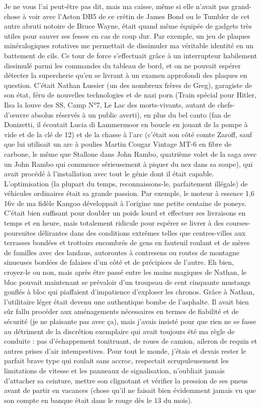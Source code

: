 Je ne vous l’ai peut-être pas dit, mais ma caisse, même si elle n’avait pas grand-chose à voir avec l’Aston DB5 de ce crétin de James Bond ou le Tumbler de cet autre abruti notoire de Bruce Wayne, était quand même équipée de gadgets très utiles pour sauver ses fesses en cas de coup dur. Par exemple, un jeu de plaques minéralogiques rotatives me permettait de dissimuler ma véritable identité en un battement de cils. Ce tour de force s’effectuait grâce à un interrupteur habilement dissimulé parmi les commandes du tableau de bord, et on ne pouvait espérer détecter la supercherie qu’en se livrant à un examen approfondi des plaques en question. C’était Nathan Lussier (un des nombreux frères de Greg), garagiste de son état, féru de nouvelles technologies et de nazi porn (Train spécial pour Hitler, Ilsa la louve des SS, Camp N°7, Le Lac des morts-vivants, autant de chefs-d’œuvre absolus réservés à un public averti), en plus du bel canto (fan de Donizetti, il écoutait Lucia di Lammermoor en boucle en jouant de la pompe à vide et de la clé de 12) et de la chasse à l’arc (c’était son côté comte Zaroff, sauf que lui utilisait un arc à poulies Martin Cougar Vintage MT-6 en fibre de carbone, le même que Stallone dans John Rambo, quatrième volet de la saga avec un John Rambo qui commence sérieusement à piquer du nez dans sa soupe), qui avait procédé à l’installation avec tout le génie dont il était capable. L’optimisation (la plupart du temps, reconnaissons-le, parfaitement illégale) de véhicules ordinaires était sa grande passion. Par exemple, le moteur à essence 1,6 16v de ma fidèle Kangoo développait à l’origine une petite centaine de poneys. C’était bien suffisant pour doubler un poids lourd et effectuer ses livraisons en temps et en heure, mais totalement ridicule pour espérer se livrer à des courses-poursuites délirantes dans des conditions extrêmes telles que centres-villes aux terrasses bondées et trottoirs encombrés de gens en fauteuil roulant et de mères de familles avec des landaus, autoroutes à contresens ou routes de montagne sinueuses bordées de falaises d’un côté et de précipices de l’autre. Eh bien, croyez-le ou non, mais après être passé entre les mains magiques de Nathan, le bloc pouvait maintenant se prévaloir d’un troupeau de cent cinquante mustangs gonflés à bloc qui piaffaient d’impatience d’exploser les chronos. Grâce à Nathan, l’utilitaire léger était devenu une authentique bombe de l’asphalte. Il avait bien sûr fallu procéder aux aménagements nécessaires en termes de fiabilité et de sécurité (je ne plaisante pas avec ça), mais j’avais insisté pour que rien ne se fasse au détriment de la discrétion exemplaire qui avait toujours été ma règle de conduite : pas d’échappement tonitruant, de roues de camion, aileron de requin et autres prises d’air intempestives. Pour tout le monde, j’étais et devais rester le parfait brave type qui roulait sans accroc, respectait scrupuleusement les limitations de vitesse et les panneaux de signalisation, n’oubliait jamais d’attacher sa ceinture, mettre son clignotant et vérifier la pression de ses pneus avant de partir en vacances (chose qu’il ne faisait bien évidemment jamais vu que son compte en banque était dans le rouge dès le 13 du mois).

